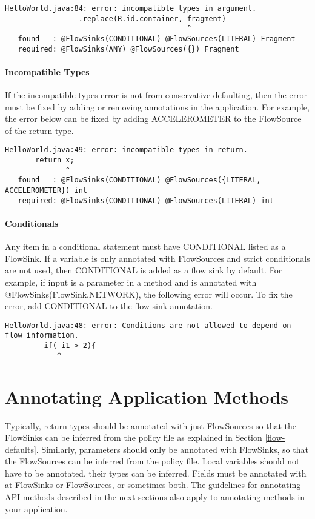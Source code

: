 \begin{Verbatim}
HelloWorld.java:84: error: incompatible types in argument.
                 .replace(R.id.container, fragment)
                                          ^
   found   : @FlowSinks(CONDITIONAL) @FlowSources(LITERAL) Fragment
   required: @FlowSinks(ANY) @FlowSources({}) Fragment
\end{Verbatim}

\paragraph{Incompatible Types}

If the incompatible types error is not from conservative defaulting, then the error must be fixed by adding or
removing annotations in the application.  For example, the error below can be fixed by adding ACCELEROMETER to the FlowSource of the return type.  

\begin{Verbatim}
HelloWorld.java:49: error: incompatible types in return.
       return x;
              ^
   found   : @FlowSinks(CONDITIONAL) @FlowSources({LITERAL, ACCELEROMETER}) int
   required: @FlowSinks(CONDITIONAL) @FlowSources(LITERAL) int
\end{Verbatim}

\paragraph{Conditionals}
Any item in a conditional statement must have CONDITIONAL listed as a FlowSink.  If a variable is only annotated with FlowSources and strict conditionals are not used, then CONDITIONAL is added as a flow sink by default.  For example, if input is a parameter in a method and is annotated with @FlowSinks(FlowSink.NETWORK), the following error will occur.  To fix the error, add CONDITIONAL to the flow sink annotation.  

\begin{Verbatim}
HelloWorld.java:48: error: Conditions are not allowed to depend on flow information.
         if( i1 > 2){
            ^
\end{Verbatim}

\section{Annotating Application Methods}

Typically, return types should be annotated with just FlowSources so that the FlowSinks can be inferred from the policy file as explained in Section \ref{flow-defaults}.
Similarly, parameters should only be annotated with FlowSinks, so that the FlowSources can be inferred from  the policy file.  Local variables should not have to be annotated, their types can be inferred. Fields must be annotated with at FlowSinks or FlowSources, or sometimes both. 
The guidelines for annotating API methods described in the next sections also apply to annotating methods in your application. 


